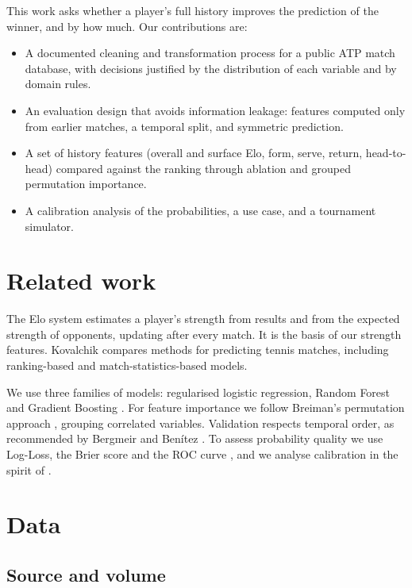\documentclass[11pt,a4paper]{article}
\begin{document}
This work asks whether a player's full history improves the prediction of the winner, and by how much. Our contributions are:
\begin{itemize}
  \item A documented cleaning and transformation process for a public ATP match database, with decisions justified by the distribution of each variable and by domain rules.
  \item An evaluation design that avoids information leakage: features computed only from earlier matches, a temporal split, and symmetric prediction.
  \item A set of history features (overall and surface Elo, form, serve, return, head-to-head) compared against the ranking through ablation and grouped permutation importance.
  \item A calibration analysis of the probabilities, a use case, and a tournament simulator.
\end{itemize}

\section{Related work}

The Elo system \cite{elo1978} estimates a player's strength from results and from the expected strength of opponents, updating after every match. It is the basis of our strength features. Kovalchik \cite{kovalchik2016} compares methods for predicting tennis matches, including ranking-based and match-statistics-based models.

We use three families of models: regularised logistic regression, Random Forest \cite{breiman2001} and Gradient Boosting \cite{friedman2001}. For feature importance we follow Breiman's permutation approach \cite{breiman2001}, grouping correlated variables. Validation respects temporal order, as recommended by Bergmeir and Benítez \cite{bergmeir2012}. To assess probability quality we use Log-Loss, the Brier score \cite{brier1950} and the ROC curve \cite{fawcett2006}, and we analyse calibration in the spirit of \cite{guo2017}.

\section{Data}

\subsection{Source and volume}
\end{document}
